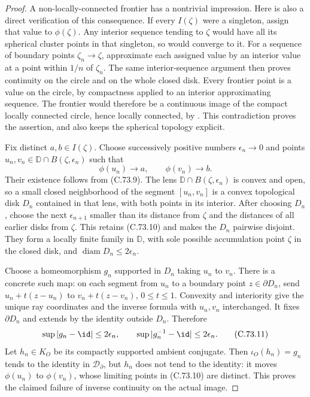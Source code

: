 \begin{proof}
A non-locally-connected frontier has a
nontrivial impression. Here is also a direct
verification of this consequence. If every
$I(\zeta)$ were a singleton, assign that value
to $\phi(\zeta)$. Any interior sequence tending
to $\zeta$ would have all its spherical cluster
points in that singleton, so would converge
to it. For a sequence of boundary points
$\zeta_n\to\zeta$, approximate each assigned
value by an interior value at a point within
$1/n$ of $\zeta_n$. The same interior-sequence
argument then proves continuity on the circle
and on the whole closed disk. Every frontier
point is a value on the circle, by compactness
applied to an interior approximating sequence.
The frontier would therefore be a continuous
image of the compact locally connected circle,
hence locally connected, by
\cite[Lemma~3.2]{C_BinderRojasYampolsky2014}.
This contradiction proves the assertion, and
also keeps the spherical topology explicit.

Fix distinct $a,b\in I(\zeta)$.
Choose successively positive numbers
$\epsilon_n\to0$ and points
$u_n,v_n\in\mathbb D\cap B(\zeta,\epsilon_n)$
such that
\[
                    \phi(u_n)\longrightarrow a,\qquad
                    \phi(v_n)\longrightarrow b .
                                                               \tag{C.73.10}
\]
Their existence follows from (C.73.9).
The lens $\mathbb D\cap B(\zeta,\epsilon_n)$
is convex and open, so a small closed
neighborhood of the segment $[u_n,v_n]$
is a convex topological disk $D_n$ contained
in that lens, with both points in its interior.
After choosing $D_n$, choose the next
$\epsilon_{n+1}$ smaller than its distance
from $\zeta$ and the distances of all earlier
disks from $\zeta$. This retains (C.73.10)
and makes the $D_n$ pairwise disjoint.
They form a locally finite family in
$\mathbb D$, with sole possible accumulation
point $\zeta$ in the closed disk, and
$\operatorname{diam}D_n\leq2\epsilon_n$.

Choose a homeomorphism $g_n$ supported in
$D_n$ taking $u_n$ to $v_n$. There is a
concrete such map: on each segment from
$u_n$ to a boundary point $z\in\partial D_n$,
send $u_n+t(z-u_n)$ to
$v_n+t(z-v_n)$, $0\leq t\leq1$.
Convexity and interiority give the unique
ray coordinates and the inverse formula
with $u_n,v_n$ interchanged. It fixes
$\partial D_n$ and extends by the identity
outside $D_n$. Therefore
\[
 \sup|g_n-\id|\leq2\epsilon_n,\qquad
 \sup|g_n^{-1}-\id|\leq2\epsilon_n .
                                                               \tag{C.73.11}
\]
Let $h_n\in K_O$ be its compactly supported
ambient conjugate. Then $\iota_O(h_n)=g_n$
tends to the identity in $\mathcal D_\partial$,
but $h_n$ does not tend to the identity:
it moves $\phi(u_n)$ to $\phi(v_n)$, whose
limiting points in (C.73.10) are distinct.
This proves the claimed failure of inverse
continuity on the actual image.


\end{proof}

